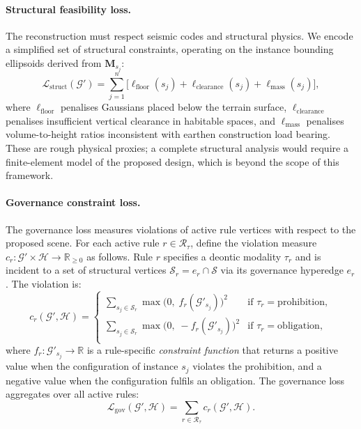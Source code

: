 \documentclass[11pt,a4paper]{article}
\theoremstyle{plain}
\theoremstyle{definition}
\theoremstyle{remark}
\newcommand{\GS}{\mathcal{G}}
\newcommand{\HG}{\mathcal{H}}
\newcommand{\Struc}{\mathcal{S}}
\newcommand{\Rul}{\mathcal{R}}
\newcommand{\Lstruct}{\mathcal{L}_{\mathrm{struct}}}
\newcommand{\Lgov}{\mathcal{L}_{\mathrm{gov}}}
\begin{document}
\paragraph{Structural feasibility loss.}
The reconstruction must respect seismic codes and structural physics.
We encode a simplified set of structural constraints, operating on
the instance bounding ellipsoids derived from $\mathbf{M}_{s_j}$:
\begin{equation}
  \Lstruct(\GS')
  = \sum_{j=1}^{n}\bigl[
    \ell_{\mathrm{floor}}(s_j)
    + \ell_{\mathrm{clearance}}(s_j)
    + \ell_{\mathrm{mass}}(s_j)
  \bigr],
  \label{eq:lstruct}
\end{equation}
where $\ell_{\mathrm{floor}}$ penalises Gaussians placed below the
terrain surface, $\ell_{\mathrm{clearance}}$ penalises insufficient
vertical clearance in habitable spaces, and $\ell_{\mathrm{mass}}$
penalises volume-to-height ratios inconsistent with earthen
construction load bearing. These are rough physical proxies; a
complete structural analysis would require a finite-element model
of the proposed design, which is beyond the scope of this framework.

\paragraph{Governance constraint loss.}
\label{sec:layer4_gov_loss}
The governance loss measures violations of active rule vertices with
respect to the proposed scene. For each active rule $r \in \Rul_\tau$,
define the violation measure
$c_r : \GS' \times \HG \to \mathbb{R}_{\geq 0}$ as follows.
Rule $r$ specifies a deontic modality $\tau_r$ and is incident to a
set of structural vertices $\Struc_r = e_r \cap \Struc$ via its
governance hyperedge $e_r$. The violation is:
\begin{equation}
  c_r(\GS', \HG)
  = \begin{cases}
      \displaystyle\sum_{s_j \in \Struc_r}
        \max\bigl(0,\; f_r(\GS'_{s_j})\bigr)^2
      & \text{if } \tau_r = \mathrm{prohibition,}\\[8pt]
      \displaystyle\sum_{s_j \in \Struc_r}
        \max\bigl(0,\; -f_r(\GS'_{s_j})\bigr)^2
      & \text{if } \tau_r = \mathrm{obligation,}\\
    \end{cases}
  \label{eq:violation}
\end{equation}
where $f_r : \GS'_{s_j} \to \mathbb{R}$ is a rule-specific
\emph{constraint function} that returns a positive value when the
configuration of instance $s_j$ violates the prohibition, and a
negative value when the configuration fulfils an obligation. The
governance loss aggregates over all active rules:
\begin{equation}
  \Lgov(\GS', \HG)
  = \sum_{r \in \Rul_\tau} c_r(\GS', \HG).
  \label{eq:lgov}
\end{equation}
\end{document}
